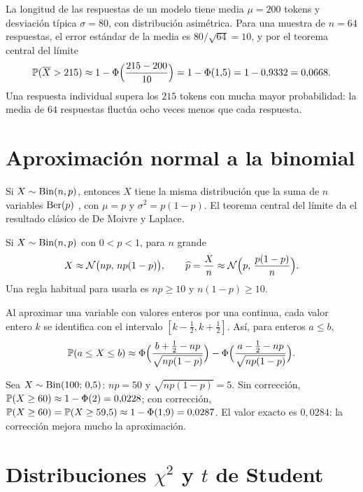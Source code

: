 \begin{ejemplo}\label{ej:t3-tcl}
La longitud de las respuestas de un modelo tiene media $\mu=200$ tokens y desviación típica $\sigma=80$, con distribución asimétrica. Para una muestra de $n=64$ respuestas, el error estándar de la media es $80/\sqrt{64}=10$, y por el teorema central del límite
\[
\mathbb{P}(\overline{X}>215)\approx1-\Phi\Bigl(\frac{215-200}{10}\Bigr)=1-\Phi(1{,}5)=1-0{,}9332=0{,}0668.
\]
Una respuesta individual supera los $215$ tokens con mucha mayor probabilidad: la media de $64$ respuestas fluctúa ocho veces menos que cada respuesta.
\end{ejemplo}

\section{Aproximación normal a la binomial}

Si $X\sim\operatorname{Bin}(n,p)$, entonces $X$ tiene la misma distribución que la suma de $n$ variables $\operatorname{Ber}(p)$ \iid, con $\mu=p$ y $\sigma^{2}=p(1-p)$. El teorema central del límite da el resultado clásico de De Moivre y Laplace.

\begin{corolario}\label{cor:t3-binomial}
Si $X\sim\operatorname{Bin}(n,p)$ con $0<p<1$, para $n$ grande
\[
X\approx\mathcal{N}\bigl(np,\,np(1-p)\bigr),\qquad \widehat p=\frac Xn\approx\mathcal{N}\Bigl(p,\,\frac{p(1-p)}{n}\Bigr).
\]
Una regla habitual para usarla es $np\ge10$ y $n(1-p)\ge10$.
\end{corolario}

\begin{definicion}\label{def:t3-cc}
Al aproximar una variable con valores enteros por una continua, cada valor entero $k$ se identifica con el intervalo $[k-\frac12,k+\frac12]$. Así, para enteros $a\le b$,
\[
\mathbb{P}(a\le X\le b)\approx\Phi\Bigl(\frac{b+\frac12-np}{\sqrt{np(1-p)}}\Bigr)-\Phi\Bigl(\frac{a-\frac12-np}{\sqrt{np(1-p)}}\Bigr).
\]
\end{definicion}

\begin{ejemplo}\label{ej:t3-binomial}
Sea $X\sim\operatorname{Bin}(100;\,0{,}5)$: $np=50$ y $\sqrt{np(1-p)}=5$. Sin corrección, $\mathbb{P}(X\ge60)\approx1-\Phi(2)=0{,}0228$; con corrección, $\mathbb{P}(X\ge60)=\mathbb{P}(X\ge59{,}5)\approx1-\Phi(1{,}9)=0{,}0287$. El valor exacto es $0{,}0284$: la corrección mejora mucho la aproximación.
\end{ejemplo}

\section{Distribuciones \texorpdfstring{$\chi^{2}$}{chi cuadrado} y \texorpdfstring{$t$}{t} de Student}

